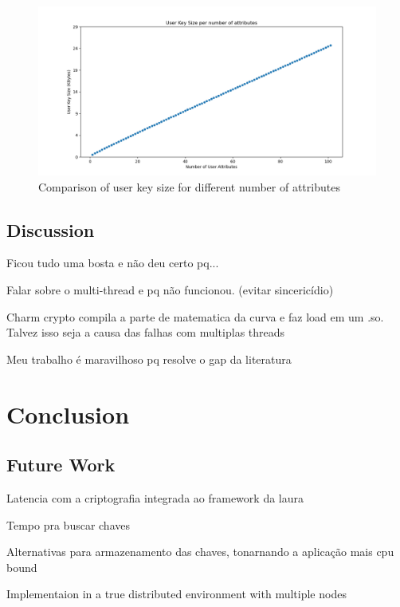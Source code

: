 \documentclass[cic,tc,english]{iiufrgs}
\begin{document}

            \begin{figure}
                \centering
                \includegraphics[width=\textwidth]{images/key_size_analysis/user_key_size_analysis.png}
                \caption{Comparison of user key size for different number of attributes}
                \label{fig:user_key_size}
            \end{figure}


        \section{Discussion}
            \label{sec:discussion}
            Ficou tudo uma bosta e não deu certo pq...

            Falar sobre o multi-thread e pq não funcionou. (evitar sincericídio)

            Charm crypto compila a parte de matematica da curva e faz load em um .so. Talvez isso seja a causa das falhas com multiplas threads

            Meu trabalho é maravilhoso pq resolve o gap da literatura


\chapter{Conclusion}
    \label{chap:conclusion}

    \section{Future Work}
        \label{sec:futurework}
        Latencia com a criptografia integrada ao framework da laura

        Tempo pra buscar chaves

        Alternativas para armazenamento das chaves, tonarnando a aplicação mais cpu bound

        Implementaion in a true distributed environment with multiple nodes




\end{document}
